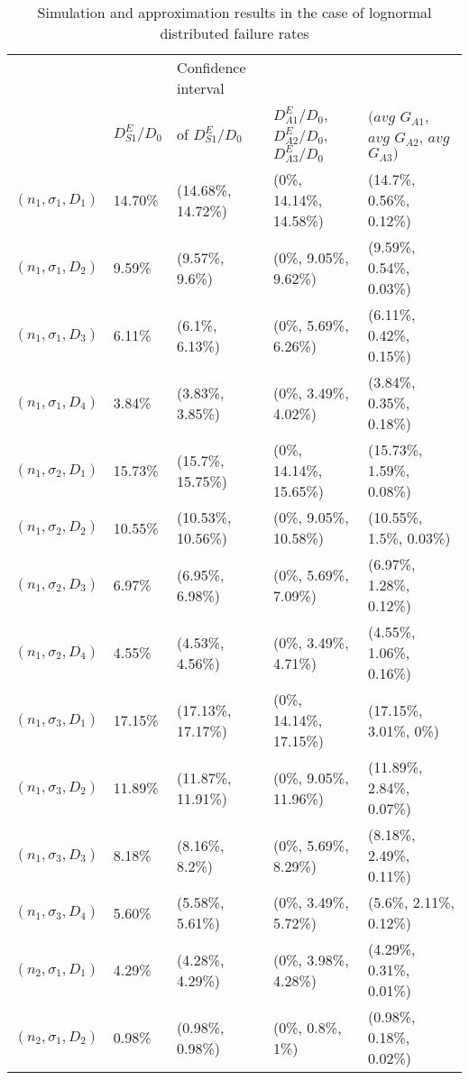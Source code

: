 \documentclass[preprint,12pt]{elsarticle}
\begin{document}
\begin{table}[htbp]
\small
  \centering
  \caption{Simulation and approximation results in the case of lognormal distributed failure rates}
    \begin{tabular}{lllll}
    \toprule
   & & Confidence interval & & \\
          & $D_{S1}^{E}/D_0$ & of $D_{S1}^{E}/D_0$  & $D^{E}_{A1}/D_{0}$, $D^{E}_{A2}/D_{0}$, $D^{E}_{A3}/D_{0}$ & $(avg$ $G_{A1}$, $avg$ $G_{A2}$, $avg$ $G_{A3})$ \\
    \midrule
    $(n_{1},\sigma_{1},D_{1})$  & 14.70\% & (14.68\%, 14.72\%) & (0\%, 14.14\%, 14.58\%) & (14.7\%, 0.56\%, 0.12\%) \\
    $(n_{1},\sigma_{1},D_{2})$ & 9.59\% & (9.57\%, 9.6\%) & (0\%, 9.05\%, 9.62\%) & (9.59\%, 0.54\%, 0.03\%) \\
    $(n_{1},\sigma_{1},D_{3})$ & 6.11\% & (6.1\%, 6.13\%) & (0\%, 5.69\%, 6.26\%) & (6.11\%, 0.42\%, 0.15\%) \\
    $(n_{1},\sigma_{1},D_{4})$ & 3.84\% & (3.83\%, 3.85\%) & (0\%, 3.49\%, 4.02\%) & (3.84\%, 0.35\%, 0.18\%) \\
   $(n_{1},\sigma_{2},D_{1})$ & 15.73\% & (15.7\%, 15.75\%) & (0\%, 14.14\%, 15.65\%) & (15.73\%, 1.59\%, 0.08\%) \\
    $(n_{1},\sigma_{2},D_{2})$ & 10.55\% & (10.53\%, 10.56\%) & (0\%, 9.05\%, 10.58\%) & (10.55\%, 1.5\%, 0.03\%) \\
   $(n_{1},\sigma_{2},D_{3})$ & 6.97\% & (6.95\%, 6.98\%) & (0\%, 5.69\%, 7.09\%) & (6.97\%, 1.28\%, 0.12\%) \\
    $(n_{1},\sigma_{2},D_{4})$ & 4.55\% & (4.53\%, 4.56\%) & (0\%, 3.49\%, 4.71\%) & (4.55\%, 1.06\%, 0.16\%) \\
     $(n_{1},\sigma_{3},D_{1})$  & 17.15\% & (17.13\%, 17.17\%) & (0\%, 14.14\%, 17.15\%) & (17.15\%, 3.01\%, 0\%) \\
     $(n_{1},\sigma_{3},D_{2})$ & 11.89\% & (11.87\%, 11.91\%) & (0\%, 9.05\%, 11.96\%) & (11.89\%, 2.84\%, 0.07\%) \\
     $(n_{1},\sigma_{3},D_{3})$ & 8.18\% & (8.16\%, 8.2\%) & (0\%, 5.69\%, 8.29\%) & (8.18\%, 2.49\%, 0.11\%) \\
     $(n_{1},\sigma_{3},D_{4})$ & 5.60\% & (5.58\%, 5.61\%) & (0\%, 3.49\%, 5.72\%) & (5.6\%, 2.11\%, 0.12\%) \\
   $(n_{2},\sigma_{1},D_{1})$ & 4.29\% & (4.28\%, 4.29\%) & (0\%, 3.98\%, 4.28\%) & (4.29\%, 0.31\%, 0.01\%) \\
   $(n_{2},\sigma_{1},D_{2})$ & 0.98\% & (0.98\%, 0.98\%) & (0\%, 0.8\%, 1\%) & (0.98\%, 0.18\%, 0.02\%) \\

\end{tabular}
\end{table}
\end{document}
